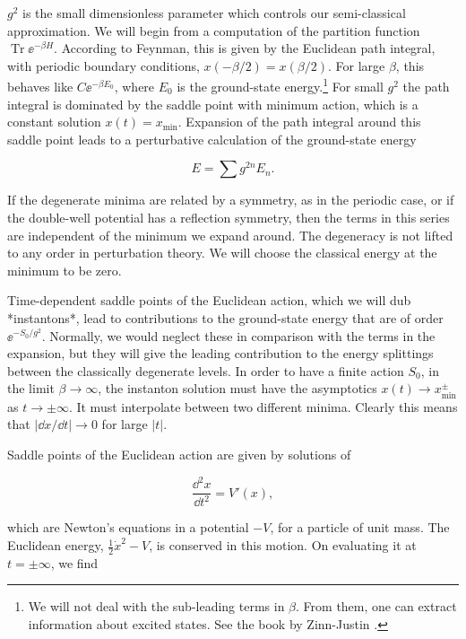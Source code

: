 $g^2$ is the small dimensionless parameter which controls our semi-classical
approximation. We will begin from a computation of the partition function
$\operatorname{Tr}\ee^{-\beta H}$. According to Feynman, this is given by the
Euclidean path integral, with periodic boundary conditions,
$x(-\beta/2)=x(\beta/2)$. For large $\beta$, this behaves like
$C\ee^{-\beta E_0}$, where $E_0$ is the ground-state energy.\footnote[1]{We
will not deal with the sub-leading terms in $\beta$. From them, one can extract
information about excited states. See the book by Zinn-Justin \cite{banks-ref-111}.} For small
$g^2$ the path integral is dominated by the saddle point with minimum action,
which is a constant solution $x(t)=x_{\min}$. Expansion of the path integral
around this saddle point leads to a perturbative calculation of the ground-state
energy

\[
  E=\sum g^{2n}E_n.
\]

If the degenerate minima are related by a symmetry, as in the periodic case, or
if the double-well potential has a reflection symmetry, then the terms in this
series are independent of the minimum we expand around. The degeneracy is not
lifted to any order in perturbation theory. We will choose the classical energy
at the minimum to be zero.

Time-dependent saddle points of the Euclidean action, which we will dub
*instantons*, lead to contributions to the ground-state energy that are of order
$\ee^{-S_0/g^2}$. Normally, we would neglect these in comparison with the terms
in the expansion, but they will give the leading contribution to the energy
splittings between the classically degenerate levels. In order to have a finite
action $S_0$, in the limit $\beta\to\infty$, the instanton solution must have the
asymptotics $x(t)\to x_{\min}^{\pm}$ as $t\to\pm\infty$. It must interpolate
between two different minima. Clearly this means that $|\dd x/\dd t|\to0$ for
large $|t|$.

Saddle points of the Euclidean action are given by solutions of

\[
  \frac{\dd^2x}{\dd t^2}=V'(x),
\]

which are Newton's equations in a potential $-V$, for a particle of unit mass.
The Euclidean energy, $\tfrac12\dot x^2-V$, is conserved in this motion. On
evaluating it at $t=\pm\infty$, we find

